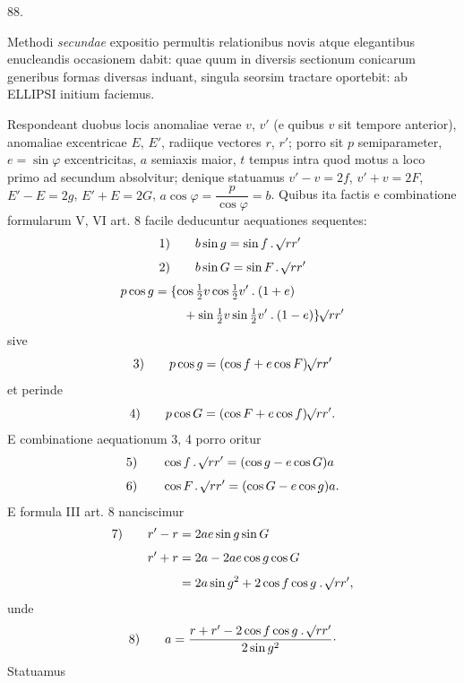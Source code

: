 \par{}\medskip
\hypertarget{native-118-article088}{}
\begin{center}88.\end{center}
Methodi \textit{secundae} expositio permultis relationibus novis atque elegantibus enucleandis occasionem dabit: quae quum in diversis sectionum conicarum generibus formas diversas induant, singula seorsim tractare oportebit: ab ELLIPSI initium faciemus.

Respondeant duobus locis anomaliae verae $v$, $v'$ (e quibus $v$ sit tempore anterior), anomaliae excentricae $E$, $E'$, radiique vectores $r$, $r'$; porro sit $p$ semiparameter, $e=\sin\varphi$ excentricitas, $a$ semiaxis maior, $t$ tempus intra quod motus a loco primo ad secundum absolvitur; denique statuamus $v'-v=2f$, $v'+v=2F$, $E'-E=2g$, $E'+E=2G$, $a\cos\varphi=\dfrac{p}{\cos\varphi}=b$. Quibus ita factis e combinatione formularum V, VI art. 8 facile deducuntur aequationes sequentes:
\[
\begin{aligned}
\mathrm{1)}\qquad&b\sin g=\sin f\mathbin{.}\mathord{{}^{}\!\surd}rr'\\[4pt]
\mathrm{2)}\qquad&b\sin G=\sin F\mathbin{.}\mathord{{}^{}\!\surd}rr'
\end{aligned}
\]
\[
\begin{aligned}
p\cos g={}&\{\cos\tfrac12v\cos\tfrac12v'\mathbin{.}(1+e)\\[3pt]
&\quad+\sin\tfrac12v\sin\tfrac12v'\mathbin{.}(1-e)\}\mathord{{}^{}\!\surd}rr'
\end{aligned}
\]
sive
\[
\mathrm{3)}\qquad p\cos g=(\cos f+e\cos F)\mathord{{}^{}\!\surd}rr'
\]
et perinde
\[
\mathrm{4)}\qquad p\cos G=(\cos F+e\cos f)\mathord{{}^{}\!\surd}rr'.
\]
E combinatione aequationum 3, 4 porro oritur
\[
\begin{aligned}
\mathrm{5)}\qquad&\cos f\mathbin{.}\mathord{{}^{}\!\surd}rr'=(\cos g-e\cos G)a\\[4pt]
\mathrm{6)}\qquad&\cos F\mathbin{.}\mathord{{}^{}\!\surd}rr'=(\cos G-e\cos g)a.
\end{aligned}
\]
E formula III art. 8 nanciscimur
\[
\begin{aligned}
\mathrm{7)}\qquad r'-r&=2ae\sin g\sin G\\[4pt]
r'+r&=2a-2ae\cos g\cos G\\[4pt]
&=2a\sin g^2+2\cos f\cos g\mathbin{.}\mathord{{}^{}\!\surd}rr',
\end{aligned}
\]
unde
\[
\mathrm{8)}\qquad a=\frac{r+r'-2\cos f\cos g\mathbin{.}\mathord{{}^{}\!\surd}rr'}{2\sin g^2}\mathpunct{\cdot}
\]
Statuamus
